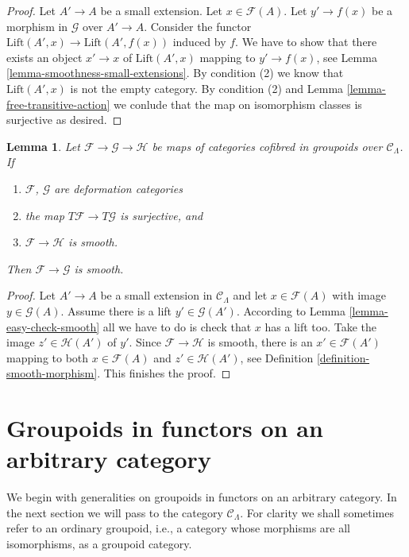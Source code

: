 \documentclass{stacks-project}
\theoremstyle{plain}
\newtheorem{lemma}[subsection]{Lemma}
\theoremstyle{definition}
\theoremstyle{remark}
\numberwithin{equation}{subsection}
\begin{document}
\begin{proof}
Let $A' \to A$ be a small extension. Let $x \in \mathcal{F}(A)$.
Let $y' \to f(x)$ be a morphism in $\mathcal{G}$ over $A' \to A$.
Consider the functor $\text{Lift}(A', x) \to \text{Lift}(A', f(x))$
induced by $f$.
We have to show that there exists an object $x' \to x$
of $\text{Lift}(A', x)$ mapping to $y' \to f(x)$, see
Lemma \ref{lemma-smoothness-small-extensions}.
By condition (2) we know that $\text{Lift}(A', x)$
is not the empty category.
By condition (2) and
Lemma \ref{lemma-free-transitive-action}
we conlude that the map on isomorphism classes
is surjective as desired.
\end{proof}

\begin{lemma}
\label{lemma-map-between-smooth}
Let $\mathcal{F} \to \mathcal{G} \to \mathcal{H}$ be maps of categories
cofibred in groupoids over $\mathcal{C}_\Lambda$. If
\begin{enumerate}
\item $\mathcal{F}$, $\mathcal{G}$ are deformation categories
\item the map $T\mathcal{F} \to T\mathcal{G}$ is surjective, and
\item $\mathcal{F} \to \mathcal{H}$ is smooth.
\end{enumerate}
Then $\mathcal{F} \to \mathcal{G}$ is smooth.
\end{lemma}

\begin{proof}
Let $A' \to A$ be a small extension in $\mathcal{C}_\Lambda$
and let $x \in \mathcal{F}(A)$ with image $y \in \mathcal{G}(A)$.
Assume there is a lift $y' \in \mathcal{G}(A')$. According to
Lemma \ref{lemma-easy-check-smooth} all we have to do is check
that $x$ has a lift too. Take the image $z' \in \mathcal{H}(A')$
of $y'$. Since $\mathcal{F} \to \mathcal{H}$ is smooth, there is
an $x' \in \mathcal{F}(A')$ mapping to both $x \in \mathcal{F}(A)$
and $z' \in \mathcal{H}(A')$, see
Definition \ref{definition-smooth-morphism}. This finishes the proof.
\end{proof}





\section{Groupoids in functors on an arbitrary category}
\label{section-groupoids-arbitrary}

\noindent
We begin with generalities on groupoids in functors on an
arbitrary category. In the next section we will
pass to the category $\mathcal{C}_\Lambda$.
For clarity we shall sometimes refer to an ordinary groupoid,
i.e., a category whose morphisms are all isomorphisms, as a groupoid category.
\end{document}
